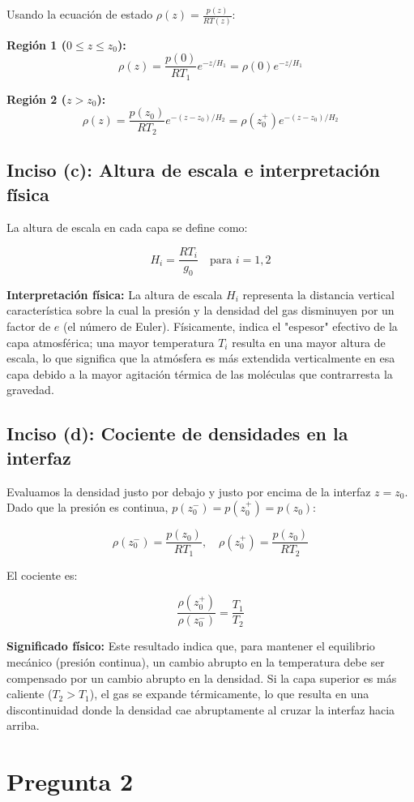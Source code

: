 \documentclass{article}
\begin{document}
Usando la ecuación de estado $\rho(z) = \frac{p(z)}{RT(z)}$:

\textbf{Región 1 ($0 \le z \le z_0$):}
$$ \rho(z) = \frac{p(0)}{R T_1} e^{-z/H_1} = \rho(0) e^{-z/H_1} $$

\textbf{Región 2 ($z > z_0$):}
$$ \rho(z) = \frac{p(z_0)}{R T_2} e^{-(z-z_0)/H_2} = \rho(z_0^+) e^{-(z-z_0)/H_2} $$

\subsection{Inciso (c): Altura de escala e interpretación física}

La altura de escala en cada capa se define como:

$$ H_i = \frac{R T_i}{g_0} \quad \text{para } i=1,2 $$

\textbf{Interpretación física:} La altura de escala $H_i$ representa la distancia vertical característica sobre la cual la presión y la densidad del gas disminuyen por un factor de $e$ (el número de Euler). Físicamente, indica el "espesor" efectivo de la capa atmosférica; una mayor temperatura $T_i$ resulta en una mayor altura de escala, lo que significa que la atmósfera es más extendida verticalmente en esa capa debido a la mayor agitación térmica de las moléculas que contrarresta la gravedad.

\subsection{Inciso (d): Cociente de densidades en la interfaz}

Evaluamos la densidad justo por debajo y justo por encima de la interfaz $z=z_0$. Dado que la presión es continua, $p(z_0^-) = p(z_0^+) = p(z_0)$:

$$ \rho(z_0^-) = \frac{p(z_0)}{R T_1}, \quad \rho(z_0^+) = \frac{p(z_0)}{R T_2} $$

El cociente es:

$$ \frac{\rho(z_0^+)}{\rho(z_0^-)} = \frac{T_1}{T_2} $$

\textbf{Significado físico:} Este resultado indica que, para mantener el equilibrio mecánico (presión continua), un cambio abrupto en la temperatura debe ser compensado por un cambio abrupto en la densidad. Si la capa superior es más caliente ($T_2 > T_1$), el gas se expande térmicamente, lo que resulta en una discontinuidad donde la densidad cae abruptamente al cruzar la interfaz hacia arriba.

\section{Pregunta 2}
\end{document}
